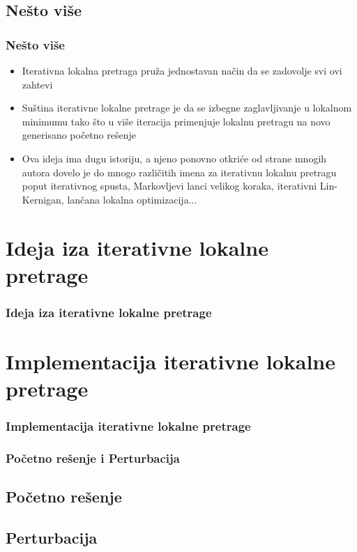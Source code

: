 \documentclass{beamer}
\begin{document}
\subsection{Nešto više}
\begin{frame}[fragile]
	\frametitle{Nešto više}
	\begin{itemize}
		\item Iterativna lokalna pretraga pruža jednostavan način da se zadovolje svi ovi zahtevi
		\item Suština iterativne lokalne pretrage je da se izbegne zaglavljivanje u lokalnom minimumu tako što u više iteracija primenjuje lokalnu pretragu na novo generisano početno rešenje
		\item Ova ideja ima dugu istoriju, a njeno ponovno otkriće od strane mnogih autora dovelo je do mnogo različitih imena za iterativnu lokalnu pretragu poput iterativnog spusta, Markovljevi lanci velikog koraka, iterativni Lin-Kernigan, lančana lokalna optimizacija...
	\end{itemize}

\end{frame}

\section{Ideja iza iterativne lokalne pretrage}
\begin{frame}
	\frametitle{Ideja iza iterativne lokalne pretrage} 

\end{frame}

\section{Implementacija iterativne lokalne pretrage}
\begin{frame}[fragile]\frametitle{Implementacija iterativne lokalne pretrage}
 
\end{frame}

\begin{frame}[fragile]\frametitle{Početno rešenje i Perturbacija}
	\subsection{Početno rešenje}
	\subsection{Perturbacija}

\end{frame}
\end{document}
